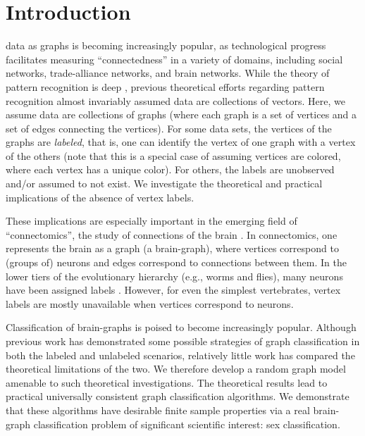 \documentclass[10pt,journal,cspaper,compsoc]{IEEEtran}
\begin{document}
\maketitle
\IEEEdisplaynotcompsoctitleabstractindextext
\IEEEpeerreviewmaketitle



\section{Introduction} \label{sec:1}

 data as graphs is becoming increasingly popular, as technological progress facilitates measuring ``connectedness'' in a variety of domains, including social networks, trade-alliance networks, and brain networks.  While the theory of pattern recognition is deep \cite{Devroye1996}, previous theoretical efforts regarding pattern recognition almost invariably assumed data are collections of vectors.  Here, we assume data are collections of graphs (where each graph is a set of vertices and a set of edges connecting the vertices).  For some data sets, the vertices of the graphs are \emph{labeled}, that is, one can identify the vertex of one graph with a vertex of the others (note that this is a special case of assuming vertices are colored, where each vertex has a unique color).  For others, the labels are unobserved and/or assumed to not exist.  We investigate the theoretical and practical implications of the absence of vertex labels.  

These implications are especially important in the emerging field of ``connectomics'', the study of connections of the brain \cite{Hagmann05, Sporns2010}.  In connectomics, one represents the brain as a graph (a brain-graph), where vertices correspond to (groups of) neurons and edges correspond to connections between them.  In the lower tiers of the evolutionary hierarchy (e.g., worms and flies), many neurons have been assigned labels \cite{WhiteBrenner86}.  However, for even the simplest vertebrates, vertex labels are mostly unavailable when vertices correspond to neurons.  

Classification of brain-graphs is poised to become increasingly popular.  Although previous work has demonstrated some possible strategies of graph classification in both the labeled \cite{VP11_sigsub} and unlabeled \cite{Duin2011} scenarios, relatively little work has compared the theoretical limitations of the two.  We therefore develop a random graph model amenable to such theoretical investigations.  The theoretical results lead to practical universally consistent graph classification algorithms.  We demonstrate that these algorithms have desirable finite sample properties via a real brain-graph classification problem of significant scientific interest: sex classification.
\end{document}
